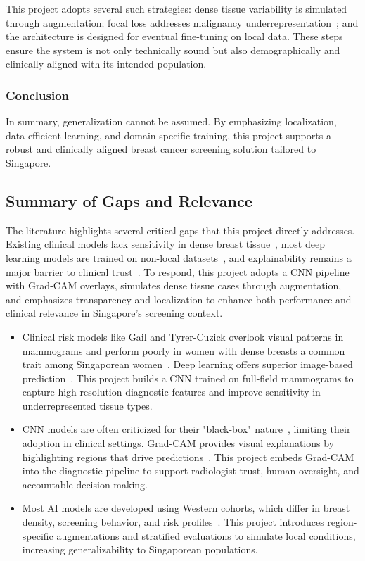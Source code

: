 \documentclass[12pt]{article}
\begin{document}
This project adopts several such strategies: dense tissue variability is simulated through augmentation; focal loss addresses malignancy underrepresentation~\cite{2}; and the architecture is designed for eventual fine-tuning on local data. These steps ensure the system is not only technically sound but also demographically and clinically aligned with its intended population.

\subsubsection{Conclusion}

In summary, generalization cannot be assumed. By emphasizing localization, data-efficient learning, and domain-specific training, this project supports a robust and clinically aligned breast cancer screening solution tailored to Singapore.

\subsection{Summary of Gaps and Relevance}

The literature highlights several critical gaps that this project directly addresses. Existing clinical models lack sensitivity in dense breast tissue~\cite{1}, most deep learning models are trained on non-local datasets~\cite{6}, and explainability remains a major barrier to clinical trust~\cite{3,5}. To respond, this project adopts a CNN pipeline with Grad-CAM overlays, simulates dense tissue cases through augmentation, and emphasizes transparency and localization to enhance both performance and clinical relevance in Singapore’s screening context.

\begin{itemize}
\item 
Clinical risk models like Gail and Tyrer-Cuzick overlook visual patterns in mammograms and perform poorly in women with dense breasts a common trait among Singaporean women~\cite{6}. Deep learning offers superior image-based prediction~\cite{1,7}. This project builds a CNN trained on full-field mammograms to capture high-resolution diagnostic features and improve sensitivity in underrepresented tissue types.

\item 
CNN models are often criticized for their "black-box" nature~\cite{3,5}, limiting their adoption in clinical settings. Grad-CAM provides visual explanations by highlighting regions that drive predictions~\cite{5}. This project embeds Grad-CAM into the diagnostic pipeline to support radiologist trust, human oversight, and accountable decision-making.

\item 
Most AI models are developed using Western cohorts, which differ in breast density, screening behavior, and risk profiles~\cite{6}. This project introduces region-specific augmentations and stratified evaluations to simulate local conditions, increasing generalizability to Singaporean populations.
\end{itemize}
\end{document}
